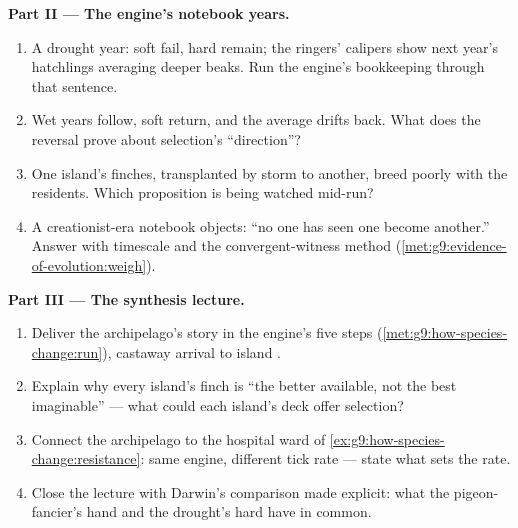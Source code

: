 \begin{problem}
\medskip\noindent\textbf{Part II --- The engine's
notebook years.}
\begin{enumerate}[resume]
  \item A drought year: soft  fail, hard 
        remain; the ringers' calipers show next year's
        hatchlings averaging deeper beaks. Run the
        engine's bookkeeping through that sentence.
  \item Wet years follow, soft  return, and the
        average drifts back. What does the reversal
        prove about selection's ``direction''?
  \item One island's finches, transplanted by storm to
        another, breed poorly with the residents. Which
        proposition is being watched mid-run?
  \item A creationist-era notebook objects: ``no one has
        seen one  become another.'' Answer with
        timescale and the convergent-witness method
        (\cref{met:g9:evidence-of-evolution:weigh}).
\end{enumerate}

\medskip\noindent\textbf{Part III --- The synthesis
lecture.}
\begin{enumerate}[resume]
  \item Deliver the archipelago's story in the engine's
        five steps
        (\cref{met:g9:how-species-change:run}), castaway
        arrival to island .
  \item Explain why every island's finch is ``the better
        available, not the best imaginable'' --- what
        could each island's deck offer selection?
  \item Connect the archipelago to the hospital ward of
        \cref{ex:g9:how-species-change:resistance}: same
        engine, different tick rate --- state what sets
        the rate.
  \item Close the lecture with Darwin's comparison made
        explicit: what the pigeon-fancier's hand and the
        drought's hard  have in common.
\end{enumerate}
\end{problem}
